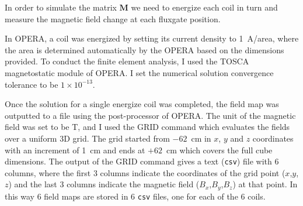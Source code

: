 In order to simulate the matrix $\bm{M}$ we need to energize each
coil in turn and measure the magnetic field change at each fluxgate
position.

In OPERA, a coil was energized by setting its current density to
1~A/area, where the area is determined automatically by the OPERA
based on the dimensions provided.  To conduct the finite element
analysis, I used the TOSCA magnetostatic module of OPERA.  I set the
numerical solution convergence tolerance to be $1\times10^{-13}$.

Once the solution for a single energize coil was completed, the field
map was outputted to a file using the post-processor of OPERA.
The unit of the magnetic field was set to be T, and I used the GRID
command which evaluates the fields over a uniform 3D grid. The grid
started from $-62$~cm in $x$, $y$ and $z$ coordinates with an
increment of 1~cm and ends at $+62$~cm which covers the full cube
dimensions.  The output of the GRID command gives a text ({\tt csv})
file with 6 columns, where the first 3 columns indicate the
coordinates of the grid point ($x$,$y$,$z$) and the last 3 columns
indicate the magnetic field ($B_x$,$B_y$,$B_z$) at that point.  In
this way 6 field maps are stored in 6 {\tt csv} files, one for each of
the 6 coils.





